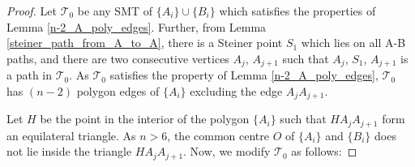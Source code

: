 \begin{proof}

Let $\mathcal{T}_0$ be any SMT of $\{A_i\} \cup \{B_i\}$ which satisfies the properties of Lemma \ref{n-2_A_poly_edges}. Further, from Lemma \ref{steiner_path_from_A_to_A}, there is a Steiner point $S_1$ which lies on all A-B paths, and there are two consecutive vertices $A_j$, $A_{j+1}$ such that $A_j$, $S_1$, $A_{j+1}$ is a path in $\mathcal T_0$. As $\mathcal T_0$ satisfies the property of Lemma \ref{n-2_A_poly_edges}, $\mathcal T_0$ has $(n - 2)$ polygon edges of $\{A_i\}$ excluding the edge $A_jA_{j+1}$.

Let $H$ be the point in the interior of the polygon $\{A_i\}$  such that $HA_jA_{j+1}$ form an equilateral triangle. As $n > 6$, the common centre $O$ of $\{A_i\}$ and $\{B_i\}$ does not lie inside the triangle $HA_jA_{j+1}$. Now, we modify $\mathcal T_0$ as follows:


\end{proof}
